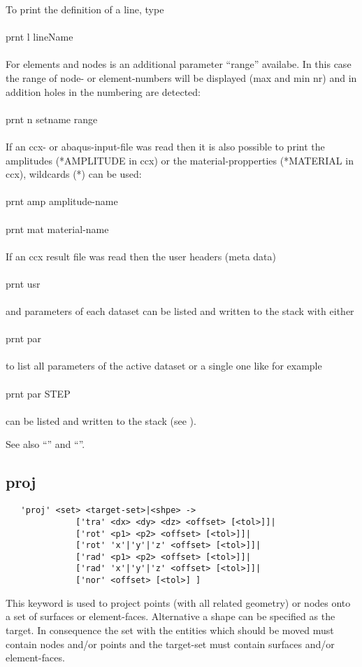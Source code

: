 \documentclass{article}
\begin{document}
To print the definition of a line, type\\\\prnt l lineName\\\\For elements and nodes is an additional parameter ``range'' availabe. In this case the range of node- or element-numbers will be displayed (max and min nr) and in addition holes in the numbering are detected:\\\\prnt n setname range\\\\ If an ccx- or abaqus-input-file was read then it is also possible to print the amplitudes (*AMPLITUDE in ccx) or the material-propperties (*MATERIAL in ccx), wildcards (*) can be used:\\\\prnt amp amplitude-name\\\\prnt mat material-name\\\\
If an ccx result file was read then the user headers (meta data)\\\\prnt usr\\\\and parameters of each dataset can be listed and written to the stack with either\\\\prnt par\\\\to list all parameters of the active dataset or a single one like for example \\\\prnt par STEP\\\\can be listed and written to the stack (see ).

See also ``'' and ``''.


\subsection{\label{proj}proj}
\begin{verbatim}
   'proj' <set> <target-set>|<shpe> ->
              ['tra' <dx> <dy> <dz> <offset> [<tol>]]|
              ['rot' <p1> <p2> <offset> [<tol>]]|
              ['rot' 'x'|'y'|'z' <offset> [<tol>]]|
              ['rad' <p1> <p2> <offset> [<tol>]]|
              ['rad' 'x'|'y'|'z' <offset> [<tol>]]|
              ['nor' <offset> [<tol>] ]   
\end{verbatim}
This keyword is used to project points (with all related geometry) or nodes onto a set of surfaces or element-faces. Alternative a shape can be specified as the target. In consequence the set with the entities which should be moved must contain nodes and/or points and the target-set must contain surfaces and/or element-faces.
\end{document}
